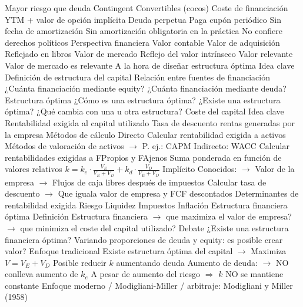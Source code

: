 \documentclass{nuevotema}
\begin{document}
\begin{esquemal}
				\4 Mayor riesgo que deuda
				\4 Contingent Convertibles (cocos)
				\4 Coste de financiación
				\4[] YTM + valor de opción implícita
			\3 Deuda perpetua
				\4 Paga cupón periódico
				\4 Sin fecha de amortización
				\4[] Sin amortización obligatoria en la práctica
				\4 No confiere derechos políticos
		\2 Perspectiva financiera
			\3 Valor contable
				\4 Valor de adquisición
				\4 Reflejado en libros
			\3 Valor de mercado
				\4 Reflejo del valor intrínseco
			\3 Valor relevante
				\4 Valor de mercado es relevante
				\4[] A la hora de diseñar estructura óptima
	\1 
		\2 Idea clave
			\3 Definición de estructura del capital
				\4 Relación entre fuentes de financiación
				\4[] ¿Cuánta financiación mediante equity?
				\4[] ¿Cuánta financiación mediante deuda?
			\3 Estructura óptima
				\4 ¿Cómo es una estructura óptima?
				\4 ¿Existe una estructura óptima?
				\4 ¿Qué cambia con una u otra estructura?
		\2 Coste del capital
			\3 Idea clave
				\4 Rentabilidad exigida al capital utilizado
				\4 Tasa de descuento rentas generadas por la empresa
			\3 Métodos de cálculo
				\4 Directo
				\4[] Calcular rentabilidad exigida a activos
				\4[] Métodos de valoración de activos
				\4[] $\to$ P. ej.: CAPM
				\4 Indirecto: WACC
				\4[] Calcular rentabilidades exigidas a FPropios y FAjenos
				\4[] Suma ponderada en función de valores relativos
				\4[] $k = k_e \cdot \frac{V_E}{V_E + V_D} + k_d \cdot \frac{V_D}{V_E + V_D}$
				\4 Implícito
				\4[] Conocidos:
				\4[] $\to$ Valor de la empresa
				\4[] $\to$ Flujos de caja libres después de impuestos
				\4[] Calcular tasa de descuento
				\4[] $\to$ Que iguala valor de empresa y FCF descontados
			\3 Determinantes de rentabilidad exigida
				\4 Riesgo
				\4 Liquidez
				\4 Impuestos
				\4 Inflación
		\2 Estructura financiera óptima
			\3 Definición
				\4 Estructura financiera
				\4[] $\to$ que maximiza el valor de empresa?
				\4[] $\to$ que minimiza el coste del capital utilizado?
			\3 Debate
				\4 ¿Existe una estructura financiera óptima?
				\4[$\to$] Variando proporciones de deuda y equity:
				\4[] es posible crear valor?
				\4 Enfoque tradicional
				\4[] Existe estructura óptima del capital
				\4[] $\to$ Maximiza $V = V_E + V_D$
				\4[] Posible reducir $k$ aumentando deuda
				\4[] Aumento de deuda:
				\4[] $\to$  NO conlleva aumento de $k_e$
				\4[] \quad A pesar de aumento del riesgo
				\4[] $\Rightarrow$ $k$ NO se mantiene constante
				\4[] 
				\4 Enfoque moderno / Modigliani-Miller / arbitraje:
				\4[] Modigliani y Miller (1958)

\end{esquemal}
\end{document}
